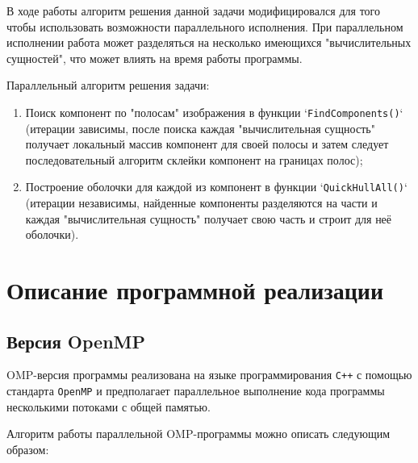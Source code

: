 \documentclass[12pt]{article}
\begin{document}
В ходе работы алгоритм решения данной задачи модифицировался для того чтобы использовать возможности параллельного исполнения. При параллельном исполнении работа может разделяться на несколько имеющихся "вычислительных сущностей", что может влиять на время работы программы.

Параллельный алгоритм решения задачи:
\begin{enumerate}
    \item Поиск компонент по "полосам" изображения в функции `\texttt{FindComponents()}` (итерации зависимы, после поиска каждая "вычислительная сущность" получает локальный массив компонент для своей полосы и затем следует последовательный алгоритм склейки компонент на границах полос);
    \item Построение оболочки для каждой из компонент в функции `\texttt{QuickHullAll()}` (итерации независимы, найденные компоненты разделяются на части и каждая "вычислительная сущность" получает свою часть и строит для неё оболочки).
\end{enumerate}

\newpage

\section{Описание программной реализации}
\subsection{Версия OpenMP}

OMP-версия программы реализована на языке программирования \texttt{C++} с помощью стандарта \texttt{OpenMP} и предполагает параллельное выполнение кода программы несколькими потоками с общей памятью.

Алгоритм работы параллельной OMP-программы можно описать следующим образом:
\end{document}
